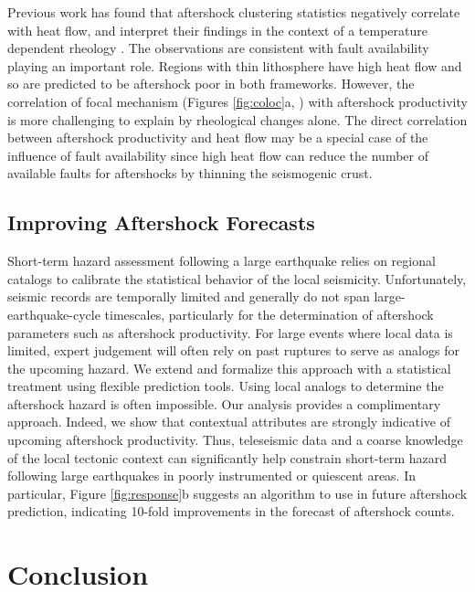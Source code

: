\documentclass[draft, jgrga]{agujournal2018}
\begin{document}
Previous work has found that aftershock clustering statistics negatively correlate with heat flow, and interpret their findings in the context of a temperature dependent rheology \citep{Ben-Zion2006AnalysisRheology, Zaliapin2016AClusters}. The observations are consistent with fault availability playing an important role. Regions with thin lithosphere have high heat flow and so are predicted to be aftershock poor in both frameworks. However, the correlation of focal mechanism (Figures \ref{fig:coloc}a, ) with aftershock productivity is more challenging to explain by rheological changes alone. The direct correlation between aftershock productivity and heat flow may be a special case of the influence of fault availability since high heat flow can reduce the number of available faults for aftershocks by thinning the seismogenic crust.
    
\subsection{Improving Aftershock Forecasts}
 
Short-term hazard assessment following a large earthquake relies on regional catalogs to calibrate the statistical behavior of the local seismicity. Unfortunately, seismic records are temporally limited and generally do not span large-earthquake-cycle timescales, particularly for the determination of aftershock parameters such as aftershock productivity. For large events where local data is limited, expert judgement will often rely on past ruptures to serve as analogs for the upcoming hazard. We extend and formalize this approach with a statistical treatment using flexible prediction tools. Using local analogs to determine the aftershock hazard is often impossible. Our analysis provides a complimentary approach. Indeed, we show that contextual attributes are strongly indicative of upcoming aftershock productivity. Thus, teleseismic data and a coarse knowledge of the local tectonic context can significantly help constrain short-term hazard following large earthquakes in poorly instrumented or quiescent areas. In particular, Figure \ref{fig:response}b suggests an algorithm to use in future aftershock prediction, indicating 10-fold improvements in the forecast of aftershock counts.

\section{Conclusion}
\end{document}
